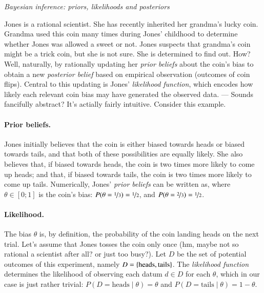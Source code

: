 \documentclass[nobib]{tufte-handout}
\begin{document}
\begin{InfoBox}[t]
\centering
\colorbox{mygray}{\centering
  \begin{minipage}{1.0\textwidth}

    \emph{Bayesian inference: priors, likelihoods and posteriors}
    \medskip

    Jones is a rational scientist. She has recently inherited her grandma's lucky coin. Grandma
    used this coin many times during Jones' childhood to determine whether Jones was allowed a
    sweet or not. Jones suspects that grandma's coin might be a trick coin, but she is not
    sure. She is determined to find out. How? Well, naturally, by rationally updating her
    \emph{prior beliefs} about the coin's bias to obtain a new \emph{posterior belief} based on
    empirical observation (outcomes of coin flips). Central to this updating is Jones'
    \emph{likelihood function}, which encodes how likely each relevant coin bias may have
    generated the observed data. --- Sounds fancifully abstract? It's actially fairly intuitive.
    Consider this example.
    
    \paragraph{Prior beliefs.} Jones initially believes that the coin is either biased towards
    heads or biased towards tails, and that both of these possibilities are equally likely. She
    also believes that, if biased towards heads, the coin is two times more likely to come up
    heads; and that, if biased towards tails, the coin is two times more likely to come up
    tails. Numerically, Jones' \emph{prior beliefs} can be written as, where $\theta \in [0;1]$
    is the coin's bias: $P(\theta = \nicefrac{1}{3}) = \nicefrac{1}{2}$, and $P(\theta =
    \nicefrac{2}{3}) = \nicefrac{1}{2}$.

    \paragraph{Likelihood.} The bias $\theta$ is, by definition, the probability of the coin
    landing heads on the next trial. Let's assume that Jones tosses the coin only once (hm,
    maybe not so rational a scientist after all? or just too busy?). Let $D$ be the set of
    potential outcomes of this experiment, namely $D = \left\{\text{heads}, \text{tails}\right\}$. The
    \emph{likelihood function} determines the likelihood of observing each datum $d \in D$ for
    each $\theta$, which in our case is just rather trivial: $P(D = \text{heads} \mid \theta) =
    \theta$ and $P(D = \text{tails} \mid \theta) = 1 - \theta$.


\end{minipage}}
\end{InfoBox}
\end{document}
